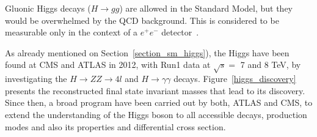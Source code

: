 Gluonic Higgs decays ($H \rightarrow gg$) are allowed in the Standard Model, but they would be overwhelmed by the QCD background. This is considered to be measurable only in the context of a $e^{+}e^{-}$ detector~\cite{Spira:1995rr}.

As already mentioned on Section~\ref{section_sm_higgs}), the Higgs have been found at CMS and ATLAS in 2012, with Run1 data at $\sqrt{s} =$ 7 and 8 TeV, by investigating the $H \rightarrow ZZ \rightarrow 4l$ and $H \rightarrow \gamma\gamma$ decays. Figure~\ref{higgs_discovery} presents the reconstructed final state invariant masses that lead to its discovery. Since then, a broad program have been carried out by both, ATLAS and CMS, to extend the understanding of the Higgs boson to all accessible decays, production modes and also its properties and differential cross section.

